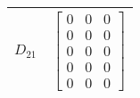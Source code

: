 \begin{tabular}{cl}
 $D_{21}$ & $\left[\begin{matrix}0 & 0 & 0\\0 & 0 & 0\\0 & 0 & 0\\0 & 0 & 0\\0 & 0 & 0\end{matrix}\right]$                                                                                                                                                                                                                                                                                                                                                                                                                                                                                                                                                                                                                                                                                                                                                                                                                                                                                                                                                                                                                                                                                                                                                                                                              \\
\hline
\end{tabular}